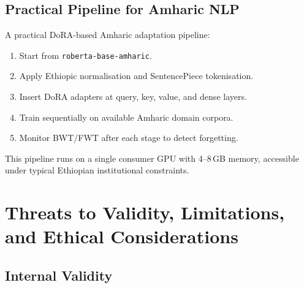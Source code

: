 \documentclass[11pt,a4paper]{article}
\begin{document}
\subsection{Practical Pipeline for Amharic NLP}

A practical DoRA-based Amharic adaptation pipeline:
\begin{enumerate}
  \item Start from \texttt{roberta-base-amharic}.
  \item Apply Ethiopic normalisation and SentencePiece tokenisation.
  \item Insert DoRA adapters at query, key, value, and dense layers.
  \item Train sequentially on available Amharic domain corpora.
  \item Monitor BWT/FWT after each stage to detect forgetting.
\end{enumerate}
This pipeline runs on a single consumer GPU with 4--8\,GB memory,
accessible under typical Ethiopian institutional constraints.

\section{Threats to Validity, Limitations, and Ethical Considerations}
\label{sec:threats}

\subsection{Internal Validity}
\end{document}
